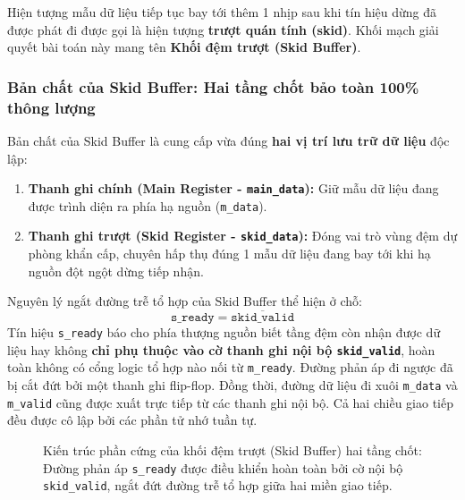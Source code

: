 Hiện tượng mẫu dữ liệu tiếp tục bay tới thêm 1 nhịp sau khi tín hiệu dừng đã được phát đi được gọi là hiện tượng \textbf{trượt quán tính (skid)}. Khối mạch giải quyết bài toán này mang tên \textbf{Khối đệm trượt (Skid Buffer)}.

\subsubsection*{Bản chất của Skid Buffer: Hai tầng chốt bảo toàn 100\% thông lượng}
Bản chất của Skid Buffer là cung cấp vừa đúng \textbf{hai vị trí lưu trữ dữ liệu} độc lập:
\begin{enumerate}[leftmargin=1.5em, itemsep=2pt]
    \item \textbf{Thanh ghi chính (Main Register - \texttt{main\_data}):} Giữ mẫu dữ liệu đang được trình diện ra phía hạ nguồn (\texttt{m\_data}).
    \item \textbf{Thanh ghi trượt (Skid Register - \texttt{skid\_data}):} Đóng vai trò vùng đệm dự phòng khẩn cấp, chuyên hấp thụ đúng 1 mẫu dữ liệu đang bay tới khi hạ nguồn đột ngột dừng tiếp nhận.
\end{enumerate}

Nguyên lý ngắt đường trễ tổ hợp của Skid Buffer thể hiện ở chỗ:
\begin{equation}
\texttt{s\_ready} = \overline{\texttt{skid\_valid}}
\end{equation}
Tín hiệu \texttt{s\_ready} báo cho phía thượng nguồn biết tầng đệm còn nhận được dữ liệu hay không \textbf{chỉ phụ thuộc vào cờ thanh ghi nội bộ \texttt{skid\_valid}}, hoàn toàn không có cổng logic tổ hợp nào nối từ \texttt{m\_ready}. Đường phản áp đi ngược đã bị cắt đứt bởi một thanh ghi flip-flop. Đồng thời, đường dữ liệu đi xuôi \texttt{m\_data} và \texttt{m\_valid} cũng được xuất trực tiếp từ các thanh ghi nội bộ. Cả hai chiều giao tiếp đều được cô lập bởi các phần tử nhớ tuần tự.

\begin{figure}[htbp]
\centering

\caption{Kiến trúc phần cứng của khối đệm trượt (Skid Buffer) hai tầng chốt: Đường phản áp \texttt{s\_ready} được điều khiển hoàn toàn bởi cờ nội bộ \texttt{skid\_valid}, ngắt đứt đường trễ tổ hợp giữa hai miền giao tiếp.}
\label{fig:ch02_skid_buffer}
\end{figure}

